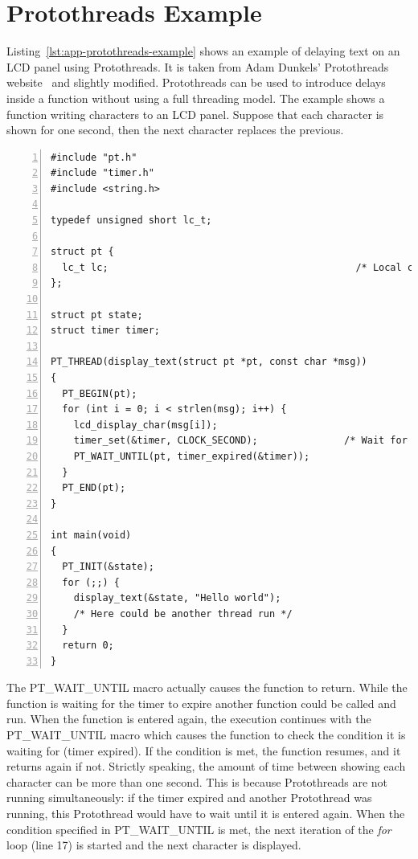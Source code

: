 
\chapter{Protothreads Example}\label{app:protothreads}
Listing~\ref{lst:app-protothreads-example} shows
an example of delaying text on an LCD panel using Protothreads.
It is taken from
Adam Dunkels' Protothreads website~\cite{adam-protothreads} and slightly modified.
Protothreads can be used to introduce delays inside a function without using a full threading model.
The example shows a function writing characters to an LCD panel.
Suppose that each character is shown for one second, then the next character replaces the previous.
\begin{lstlisting}[numbers=left,caption={Example using Protothreads},label=lst:app-protothreads-example]
#include "pt.h"
#include "timer.h"
#include <string.h>

typedef unsigned short lc_t;

struct pt {
  lc_t lc;                                           /* Local continuation */
};

struct pt state;
struct timer timer;

PT_THREAD(display_text(struct pt *pt, const char *msg))
{
  PT_BEGIN(pt);
  for (int i = 0; i < strlen(msg); i++) {
    lcd_display_char(msg[i]);
    timer_set(&timer, CLOCK_SECOND);               /* Wait for one second. */
    PT_WAIT_UNTIL(pt, timer_expired(&timer));
  }
  PT_END(pt);
}

int main(void)
{
  PT_INIT(&state);
  for (;;) {
    display_text(&state, "Hello world");
    /* Here could be another thread run */
  }
  return 0;
}
\end{lstlisting}
The PT\_WAIT\_UNTIL macro actually causes the function to return.
While the function is waiting for the timer to expire another function could be called and run.
When the function is entered again, the execution continues with the PT\_WAIT\_UNTIL macro
which causes the function to check the condition it is waiting for (timer expired).
If the condition is met, the function resumes, and it returns again if not.
Strictly speaking, the amount of time between showing each character can
be more than one second.
This is because Protothreads are not running simultaneously: if the timer expired
and another Protothread was running, this Protothread would have to wait until
it is entered again.
When the condition specified in PT\_WAIT\_UNTIL is met,
the next iteration of the {\it{for}} loop (line 17) is started and the next character is displayed.

